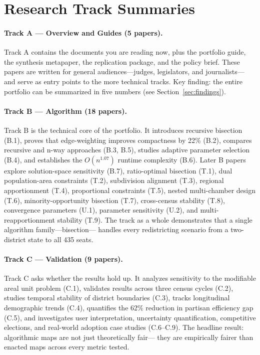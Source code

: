 
\section{Research Track Summaries}

\paragraph{Track A --- Overview and Guides (5 papers).}
Track A contains the documents you are reading now, plus the portfolio guide,
the synthesis metapaper, the replication package, and the policy brief.
These papers are written for general audiences---judges, legislators, and journalists---
and serve as entry points to the more technical tracks.
Key finding: the entire portfolio can be summarized in five numbers
(see Section~\ref{sec:findings}).

\paragraph{Track B --- Algorithm (18 papers).}
Track B is the technical core of the portfolio.
It introduces recursive bisection (B.1), proves that edge-weighting
improves compactness by 22\% (B.2), compares recursive and n-way approaches
(B.3, B.5), studies adaptive parameter selection (B.4), and establishes
the $O(n^{1.07})$ runtime complexity (B.6).
Later B papers explore solution-space sensitivity (B.7), ratio-optimal
bisection (T.1), dual population-area constraints (T.2), subdivision
alignment (T.3), regional apportionment (T.4), proportional constraints
(T.5), nested multi-chamber design (T.6), minority-opportunity bisection (T.7),
cross-census stability (T.8), convergence parameters (U.1), parameter
sensitivity (U.2), and multi-reapportionment stability (T.9).
The track as a whole demonstrates that a single algorithm family---bisection---
handles every redistricting scenario from a two-district state to all 435 seats.

\paragraph{Track C --- Validation (9 papers).}
Track C asks whether the results hold up.
It analyzes sensitivity to the modifiable areal unit problem (C.1),
validates results across three census cycles (C.2), studies temporal
stability of district boundaries (C.3), tracks longitudinal demographic
trends (C.4), quantifies the 62\% reduction in partisan efficiency gap (C.5),
and investigates user interpretation, uncertainty quantification, competitive
elections, and real-world adoption case studies (C.6--C.9).
The headline result: algorithmic maps are not just theoretically fair---
they are empirically fairer than enacted maps across every metric tested.

